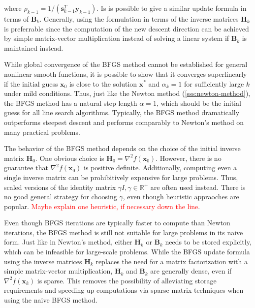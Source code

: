 \noindent where $\rho_{k-1} = 1 / (\bm{s}^T_{k-1}\bm{y}_{k-1})$. Is is possible to give a similar update formula in terms of $\bm{B}_k$.
Generally, using the formulation in terms of the inverse matrices $\bm{H}_k$ is preferrable since the computation of the new descent 
direction can
be achieved by simple matrix-vector multiplication instead of solving a linear system if $\bm{B}_k$ is maintained instead.

While global convergence of the BFGS method cannot be established for general nonlinear smooth functions, it is possible to show that it converges 
superlinearly if the initial guess $\bm{x}_0$ is close to the solution $\bm{x}^*$ and $\alpha_k = 1$ for sufficiently large $k$ \cite{nocedal2006}
under mild conditions. Thus, just like the Newton method (\cref{sss:newton-method}), the BFGS method has a natural step length $\alpha=1$,
which should be the initial guess for all line search algorithms. Typically, the BFGS method dramatically outperforms steepest 
descent and performs comparably to Newton's method on many practical problems. 

The behavior of the BFGS method depends on the choice of the initial inverse matrix $\bm{H}_0$. One obvious choice is $\bm{H}_0 = \nabla^2 
f(\bm{x}_0)$. However, there is no guarantee that $\nabla^2 f(\bm{x}_0)$ is positive definite. Additionally, computing even a single inverse
matrix can be prohibitively expensive for large problems. Thus, scaled versions of the identity matrix $\gamma I, \gamma \in \mathbb{R}^+$ are
often used instead. There is no good general strategy for choosing $\gamma$, even though heuristic appraoches are popular. \textcolor{red}{Maybe
explain one heuristic, if necessary down the line}.

Even though BFGS iterations are typically faster to compute than Newton iterations, the BFGS method is still not suitable for large problems 
in its naive form. Just like in Newton's method, either $\bm{H}_k$ or $\bm{B}_k$ needs to be stored explicitly, which can be infeasible for 
large-scale problems. While the BFGS update formula using the inverse matrices $\bm{H}_k$ replaces the need for a matrix factorization with a simple 
matrix-vector multiplication, $\bm{H}_k$ and $\bm{B}_k$ are generally dense, even if $\nabla^2 f(\bm{x}_k)$ is sparse. This removes the possibility
of alleviating storage requirements and speeding up computations via sparse matrix techniques when using the naive BFGS method.

